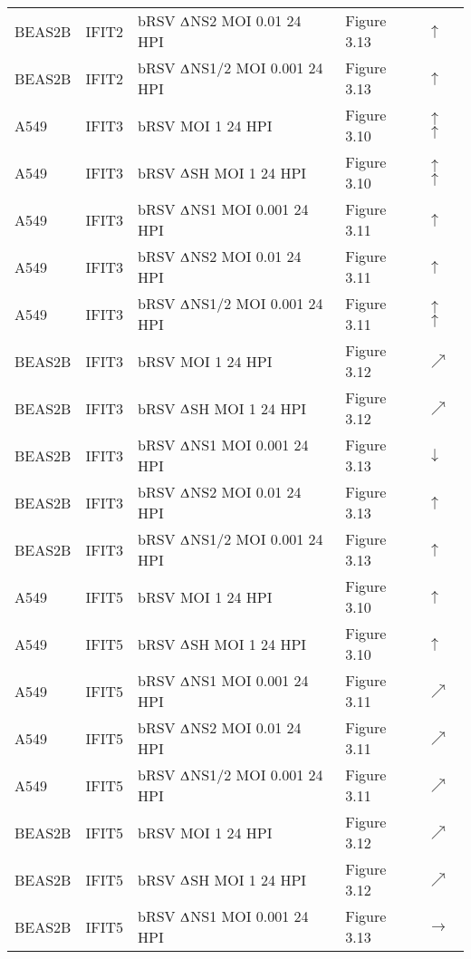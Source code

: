 \begin{table}
\begin{tabular}{lllll}
        BEAS2B & IFIT2 & bRSV $\Updelta$NS2 MOI 0.01 24 HPI & Figure 3.13 & \(\uparrow\) \\ 
        BEAS2B & IFIT2 & bRSV $\Updelta$NS1/2 MOI 0.001 24 HPI & Figure 3.13 & \(\uparrow\) \\ 
        A549 & IFIT3 & bRSV MOI 1 24 HPI & Figure 3.10 & \(\uparrow\)\(\uparrow\) \\ 
        A549 & IFIT3 & bRSV $\Updelta$SH MOI 1 24 HPI & Figure 3.10 & \(\uparrow\)\(\uparrow\) \\ 
        A549 & IFIT3 & bRSV $\Updelta$NS1 MOI 0.001 24 HPI & Figure 3.11 & \(\uparrow\) \\ 
        A549 & IFIT3 & bRSV $\Updelta$NS2 MOI 0.01 24 HPI & Figure 3.11 & \(\uparrow\) \\ 
        A549 & IFIT3 & bRSV $\Updelta$NS1/2 MOI 0.001 24 HPI & Figure 3.11 & \(\uparrow\)\(\uparrow\) \\ 
        BEAS2B & IFIT3 & bRSV MOI 1 24 HPI & Figure 3.12 & \(\nearrow\) \\ 
        BEAS2B & IFIT3 & bRSV $\Updelta$SH MOI 1 24 HPI & Figure 3.12 & \(\nearrow\) \\ 
        BEAS2B & IFIT3 & bRSV $\Updelta$NS1 MOI 0.001 24 HPI & Figure 3.13 & \(\downarrow\) \\ 
        BEAS2B & IFIT3 & bRSV $\Updelta$NS2 MOI 0.01 24 HPI & Figure 3.13 & \(\uparrow\) \\ 
        BEAS2B & IFIT3 & bRSV $\Updelta$NS1/2 MOI 0.001 24 HPI & Figure 3.13 & \(\uparrow\) \\ 
        A549 & IFIT5 & bRSV MOI 1 24 HPI & Figure 3.10 & \(\uparrow\) \\ 
        A549 & IFIT5 & bRSV $\Updelta$SH MOI 1 24 HPI & Figure 3.10 & \(\uparrow\) \\ 
        A549 & IFIT5 & bRSV $\Updelta$NS1 MOI 0.001 24 HPI & Figure 3.11 & \(\nearrow\) \\ 
        A549 & IFIT5 & bRSV $\Updelta$NS2 MOI 0.01 24 HPI & Figure 3.11 & \(\nearrow\) \\ 
        A549 & IFIT5 & bRSV $\Updelta$NS1/2 MOI 0.001 24 HPI & Figure 3.11 & \(\nearrow\) \\ 
        BEAS2B & IFIT5 & bRSV MOI 1 24 HPI & Figure 3.12 & \(\nearrow\) \\ 
        BEAS2B & IFIT5 & bRSV $\Updelta$SH MOI 1 24 HPI & Figure 3.12 & \(\nearrow\) \\ 
        BEAS2B & IFIT5 & bRSV $\Updelta$NS1 MOI 0.001 24 HPI & Figure 3.13 & \(\rightarrow\) \\ 

\end{tabular}
\end{table}
